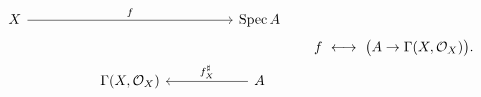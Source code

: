\[
\begin{tikzcd}[column sep=huge,row sep=large]
X \arrow[rr,"f"] && \Spec A\\
& \Gamma(X,\OO_X) & A \arrow[l,"f^\sharp_X"']
\end{tikzcd}
\qquad
f\ \longleftrightarrow\ \bigl(A\to\Gamma(X,\OO_X)\bigr).
\]
